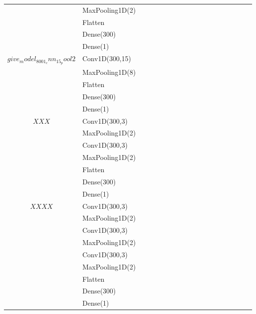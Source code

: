 \begin{longtable}{| c | m{0.58\linewidth} | r | m{0.1\linewidth} |}
                                   & MaxPooling1D(2)           \\
                                   & Flatten                   \\
                                   & Dense(300)                \\
                                   & Dense(1)                  \\ \hline
    $give_model_8001_cnn_15_pool2$ & Conv1D(300,15)            \\
                                   & MaxPooling1D(8)           \\
                                   & Flatten                   \\
                                   & Dense(300)                \\
                                   & Dense(1)                  \\ \hline
    $XXX$                          & Conv1D(300,3)             \\
                                   & MaxPooling1D(2)           \\
                                   & Conv1D(300,3)             \\
                                   & MaxPooling1D(2)           \\
                                   & Flatten                   \\
                                   & Dense(300)                \\
                                   & Dense(1)                  \\ \hline

    $XXXX$                         & Conv1D(300,3)             \\
                                   & MaxPooling1D(2)           \\
                                   & Conv1D(300,3)             \\
                                   & MaxPooling1D(2)           \\
                                   & Conv1D(300,3)             \\
                                   & MaxPooling1D(2)           \\
                                   & Flatten                   \\
                                   & Dense(300)                \\
                                   & Dense(1)                  \\ \hline


\end{longtable}
